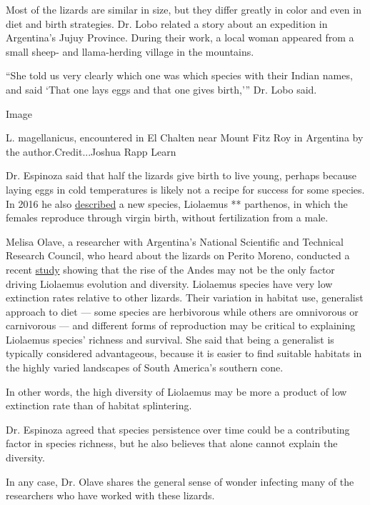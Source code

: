 Most of the lizards are similar in size, but they differ greatly in
color and even in diet and birth strategies. Dr. Lobo related a story
about an expedition in Argentina's Jujuy Province. During their work, a
local woman appeared from a small sheep- and llama-herding village in
the mountains.

``She told us very clearly which one was which species with their Indian
names, and said `That one lays eggs and that one gives birth,''' Dr.
Lobo said.

Image

L. magellanicus, encountered in El Chalten near Mount Fitz Roy in
Argentina by the author.Credit...Joshua Rapp Learn

Dr. Espinoza said that half the lizards give birth to live young,
perhaps because laying eggs in cold temperatures is likely not a recipe
for success for some species. In 2016 he also
\href{https://bioone.org/journals/Copeia/volume-104/issue-2/CH-15-381/The-First-Parthenogenetic-Pleurodont-Iguanian--A-New-All-female/10.1643/CH-15-381.short}{described}
a new species, Liolaemus ** parthenos, in which the females reproduce
through virgin birth, without fertilization from a male.

Melisa Olave, a researcher with Argentina's National Scientific and
Technical Research Council, who heard about the lizards on Perito
Moreno, conducted a recent
\href{https://onlinelibrary.wiley.com/doi/full/10.1111/jbi.13807?campaign=woletoc}{study}
showing that the rise of the Andes may not be the only factor driving
Liolaemus evolution and diversity. Liolaemus species have very low
extinction rates relative to other lizards. Their variation in habitat
use, generalist approach to diet --- some species are herbivorous while
others are omnivorous or carnivorous --- and different forms of
reproduction may be critical to explaining Liolaemus species' richness
and survival. She said that being a generalist is typically considered
advantageous, because it is easier to find suitable habitats in the
highly varied landscapes of South America's southern cone.

In other words, the high diversity of Liolaemus may be more a product of
low extinction rate than of habitat splintering.

Dr. Espinoza agreed that species persistence over time could be a
contributing factor in species richness, but he also believes that alone
cannot explain the diversity.

In any case, Dr. Olave shares the general sense of wonder infecting many
of the researchers who have worked with these lizards.


